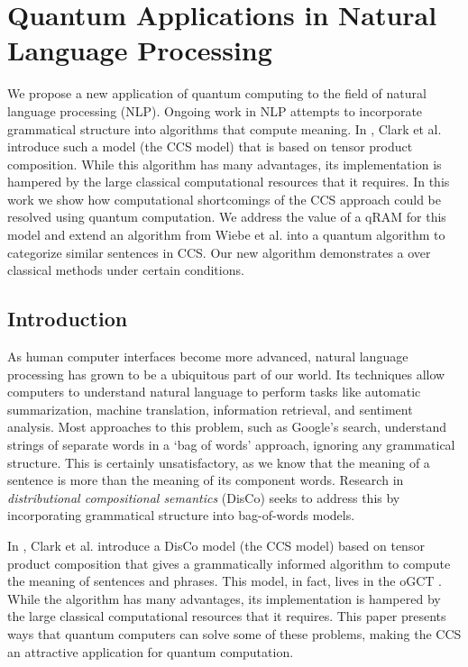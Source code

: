 \chapter{Quantum Applications in Natural Language Processing}
\label{chap:qDisCo}

\begin{chapabstract}
        We propose a new application of quantum computing to the field of natural language processing (NLP).  Ongoing work in NLP attempts to incorporate grammatical structure into algorithms that compute meaning.  In \cite{clark2008compositional}, Clark et al. introduce such a model (the CCS model) that is based on tensor product composition. While this algorithm has many advantages, its implementation is hampered by the large classical computational resources that it requires. In this work we show how computational shortcomings of the  CCS approach could be resolved using quantum computation. We address the value of a qRAM \cite{giovannetti2008quantum} for this model and extend an algorithm from Wiebe et al. \cite{wiebe2014quantum} into a quantum algorithm to categorize similar sentences in CCS. Our new algorithm demonstrates a  over classical methods under certain conditions.
\end{chapabstract}

\section{Introduction}

As human computer interfaces become more advanced, natural language processing has grown to be a ubiquitous part of our world.  Its techniques allow computers to understand natural language to perform tasks like automatic summarization, machine translation, information retrieval, and sentiment analysis. Most approaches to this problem, such as Google's search, understand strings of separate words in a `bag of words' approach, ignoring any grammatical structure. This is certainly unsatisfactory, as we know that the meaning of a sentence is more than the meaning of its component words. Research in \textit{distributional compositional semantics} (DisCo) seeks to address this by incorporating grammatical structure into bag-of-words models. 

In \cite{clark2008compositional}, Clark et al. introduce a DisCo model (the CCS model) based on tensor product composition that gives a grammatically informed algorithm to compute the meaning of sentences and phrases. This model, in fact, lives in the oGCT . While the algorithm has many advantages, its implementation is hampered by the large classical computational resources that it requires.  This paper presents ways that quantum computers can solve some of these problems, making the CCS an attractive application for quantum computation.

